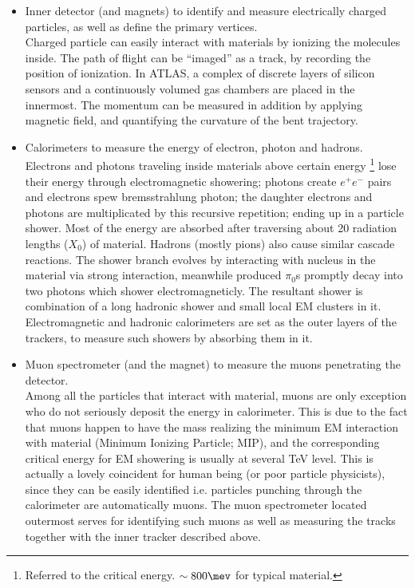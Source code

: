 \begin{itemize}
\item Inner detector (and magnets) to identify and measure electrically charged particles, as well as define the primary vertices. \\
Charged particle can easily interact with materials by ionizing the molecules inside. The path of flight can be ``imaged'' as a track, by recording the position of ionization. 
In ATLAS, a complex of discrete layers of silicon sensors and a continuously volumed gas chambers are placed in the innermost. 
The momentum can be measured in addition by applying magnetic field, and quantifying the curvature of the bent trajectory. 

\item Calorimeters to measure the energy of electron, photon and hadrons. \\
Electrons and photons traveling inside materials above certain energy 
\footnote{Referred to the critical energy. $\sim 800 \mev$ for typical material.}
lose their energy through electromagnetic showering; photons create $e^+e^-$ pairs and electrons spew bremsstrahlung photon; 
the daughter electrons and photons are multiplicated by this recursive repetition; ending up in a particle shower. 
Most of the energy are absorbed after traversing about 20 radiation lengths ($X_0$) of material. 
Hadrons (mostly pions) also cause similar cascade reactions. 
The shower branch evolves by interacting with nucleus in the material via strong interaction, meanwhile produced $\pi_0$s promptly decay into two photons which shower electromagneticly. 
The resultant shower is combination of a long hadronic shower and small local EM clusters in it. 
Electromagnetic and hadronic calorimeters are set as the outer layers of the trackers, to measure such showers by absorbing them in it.\\

\item Muon spectrometer (and the magnet) to measure the muons penetrating the detector. \\
Among all the particles that interact with material, muons are only exception who do not seriously deposit the energy in calorimeter. 
This is due to the fact that muons happen to have the mass realizing the minimum EM interaction with material (Minimum Ionizing Particle; MIP), 
and the corresponding critical energy for EM showering is usually at several TeV level.
This is actually a lovely coincident for human being (or poor particle physicists), 
since they can be easily identified i.e. particles punching through the calorimeter are automatically muons. The muon spectrometer located outermost serves for identifying such muons as well as measuring the tracks together with the inner tracker described above.


\end{itemize}
